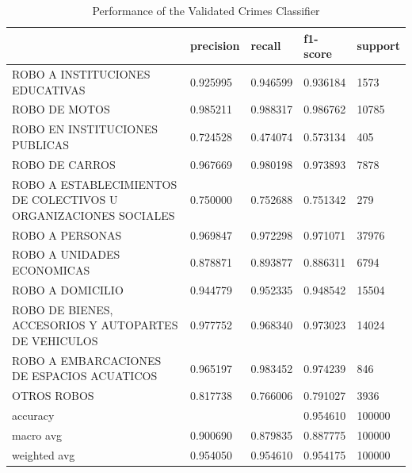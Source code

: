 \documentclass[onecolumn, journal, english, 12pt, a4paper]{IEEEtran} %
\theoremstyle{definition}
\begin{document}
\begin{table}[htbp]
    \caption{Performance of the Validated Crimes Classifier}
    \label{tab:reporteClasificacionModeloDelitosValidados}
    \centering
    \scriptsize
    \begin{tabularx}{\textwidth}{p{}XXXX}
        \toprule
         & precision & recall & f1-score & support \\
        \midrule
        ROBO A INSTITUCIONES EDUCATIVAS & 0.925995 & 0.946599 & 0.936184 & 1573 \\
        ROBO DE MOTOS & 0.985211 & 0.988317 & 0.986762 & 10785 \\
        ROBO EN INSTITUCIONES PUBLICAS & 0.724528 & 0.474074 & 0.573134 & 405 \\
        ROBO DE CARROS & 0.967669 & 0.980198 & 0.973893 & 7878 \\
        ROBO A ESTABLECIMIENTOS DE COLECTIVOS U ORGANIZACIONES SOCIALES & 0.750000 & 0.752688 & 0.751342 & 279 \\
        ROBO A PERSONAS & 0.969847 & 0.972298 & 0.971071 & 37976 \\
        ROBO A UNIDADES ECONOMICAS & 0.878871 & 0.893877 & 0.886311 & 6794 \\
        ROBO A DOMICILIO & 0.944779 & 0.952335 & 0.948542 & 15504 \\
        ROBO DE BIENES, ACCESORIOS Y AUTOPARTES DE VEHICULOS & 0.977752 & 0.968340 & 0.973023 & 14024 \\
        ROBO A EMBARCACIONES DE ESPACIOS ACUATICOS & 0.965197 & 0.983452 & 0.974239 & 846\\
        OTROS ROBOS & 0.817738 & 0.766006 & 0.791027 & 3936 \\ \hline
        accuracy & {} & {} & 0.954610 & 100000 \\
        macro avg & 0.900690 & 0.879835 & 0.887775 & 100000 \\
        weighted avg & 0.954050 & 0.954610 & 0.954175 & 100000 \\
        \bottomrule
    \end{tabularx}
    
\end{table}
\end{document}
